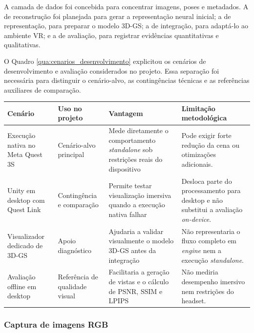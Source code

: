 A camada de dados foi concebida para concentrar imagens, poses e metadados. A de reconstrução foi planejada para gerar a representação neural inicial; a de representação, para preparar o modelo 3D-GS; a de integração, para adaptá-lo ao ambiente VR; e a de avaliação, para registrar evidências quantitativas e qualitativas.

O Quadro \ref{qua:cenarios_desenvolvimento} explicitou os cenários de desenvolvimento e avaliação considerados no projeto. Essa separação foi necessária para distinguir o cenário-alvo, as contingências técnicas e as referências auxiliares de comparação.

\begin{quadro}[H]
\centering
\footnotesize
\caption{Cenários de desenvolvimento e avaliação considerados.}
\label{qua:cenarios_desenvolvimento}
\renewcommand{\arraystretch}{1.2}
\begin{tabularx}{\textwidth}{|p{3.1cm}|p{3.0cm}|p{3.2cm}|X|}
\hline
\textbf{Cenário} & \textbf{Uso no projeto} & \textbf{Vantagem} & \textbf{Limitação metodológica} \\ \hline

Execução nativa no Meta Quest 3S & Cenário-alvo principal & Mede diretamente o comportamento \textit{standalone} sob restrições reais do dispositivo & Pode exigir forte redução da cena ou otimizações adicionais. \\ \hline

Unity em desktop com Quest Link & Contingência e comparação & Permite testar visualização imersiva quando a execução nativa falhar & Desloca parte do processamento para desktop e não substitui a avaliação \textit{on-device}. \\ \hline

Visualizador dedicado de 3D-GS & Apoio diagnóstico & Ajudaria a validar visualmente o modelo 3D-GS antes da integração & Não representaria o fluxo completo em \textit{engine} nem a execução \textit{standalone}. \\ \hline

Avaliação offline em desktop & Referência de qualidade visual & Facilitaria a geração de vistas e o cálculo de PSNR, SSIM e LPIPS & Não mediria desempenho imersivo nem restrições do headset. \\ \hline

\end{tabularx}
\end{quadro}

\subsubsection{Captura de imagens RGB}

